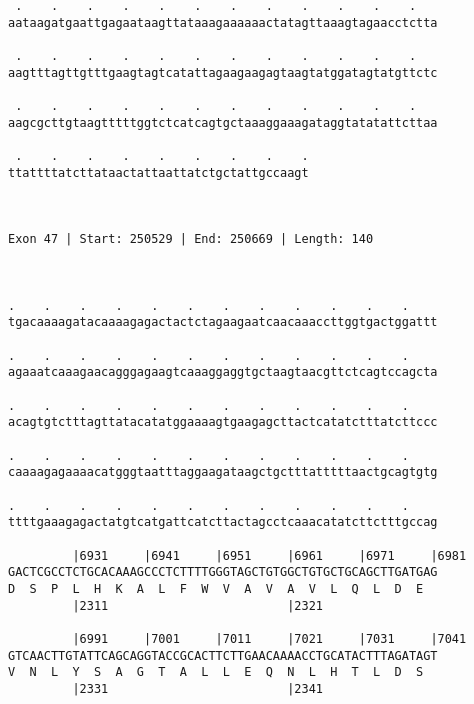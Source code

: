 \documentclass{article}
\begin{document}
\begin{Verbatim}
 .    .    .    .    .    .    .    .    .    .    .    .   
aataagatgaattgagaataagttataaagaaaaaactatagttaaagtagaacctctta
                                                            
 .    .    .    .    .    .    .    .    .    .    .    .   
aagtttagttgtttgaagtagtcatattagaagaagagtaagtatggatagtatgttctc
                                                            
 .    .    .    .    .    .    .    .    .    .    .    .   
aagcgcttgtaagtttttggtctcatcagtgctaaaggaaagataggtatatattcttaa
                                                            
 .    .    .    .    .    .    .    .    .
ttattttatcttataactattaattatctgctattgccaagt
                                          
                                          
 
Exon 47 | Start: 250529 | End: 250669 | Length: 140



.    .    .    .    .    .    .    .    .    .    .    .    
tgacaaaagatacaaaagagactactctagaagaatcaacaaaccttggtgactggattt
                                                            
.    .    .    .    .    .    .    .    .    .    .    .    
agaaatcaaagaacagggagaagtcaaaggaggtgctaagtaacgttctcagtccagcta
                                                            
.    .    .    .    .    .    .    .    .    .    .    .    
acagtgtctttagttatacatatggaaaagtgaagagcttactcatatctttatcttccc
                                                            
.    .    .    .    .    .    .    .    .    .    .    .    
caaaagagaaaacatgggtaatttaggaagataagctgctttatttttaactgcagtgtg
                                                            
.    .    .    .    .    .    .    .    .    .    .    .    
ttttgaaagagactatgtcatgattcatcttactagcctcaaacatatcttctttgccag
                                                            
         |6931     |6941     |6951     |6961     |6971     |6981
GACTCGCCTCTGCACAAAGCCCTCTTTTGGGTAGCTGTGGCTGTGCTGCAGCTTGATGAG
D  S  P  L  H  K  A  L  F  W  V  A  V  A  V  L  Q  L  D  E  
         |2311                         |2321                
  
         |6991     |7001     |7011     |7021     |7031     |7041
GTCAACTTGTATTCAGCAGGTACCGCACTTCTTGAACAAAACCTGCATACTTTAGATAGT
V  N  L  Y  S  A  G  T  A  L  L  E  Q  N  L  H  T  L  D  S  
         |2331                         |2341                
  

\end{Verbatim}
\end{document}
